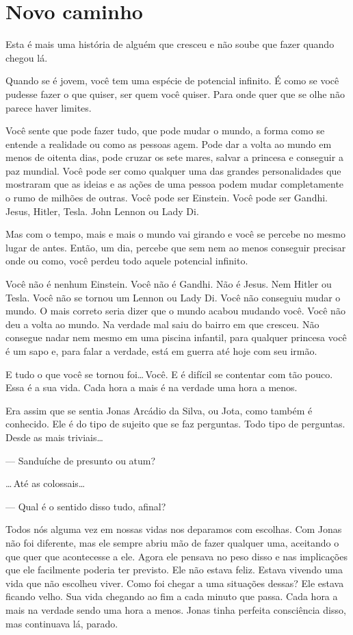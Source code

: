 \chapter{Novo caminho}

Esta é mais uma história de alguém que cresceu e não soube que fazer quando chegou lá.

Quando se é jovem, você tem uma espécie de potencial infinito. É como se você pudesse fazer o que quiser, ser quem você quiser. Para onde quer que se olhe não parece haver limites.

Você sente que pode fazer tudo, que pode mudar o mundo, a forma como se entende a realidade ou como as pessoas agem. Pode dar a volta ao mundo em menos de oitenta dias, pode cruzar os sete mares, salvar a princesa e conseguir a paz mundial. Você pode ser como qualquer uma das grandes personalidades que mostraram que as ideias e as ações de uma pessoa podem mudar completamente o rumo de milhões de outras. Você pode ser Einstein. Você pode ser Gandhi. Jesus, Hitler, Tesla. John Lennon ou Lady Di.

Mas com o tempo, mais e mais o mundo vai girando e você se percebe no mesmo lugar de antes. Então, um dia, percebe que sem nem ao menos conseguir precisar onde ou como, você perdeu todo aquele potencial infinito.

Você não é nenhum Einstein. Você não é Gandhi. Não é Jesus. Nem Hitler ou Tesla. Você não se tornou um Lennon ou Lady Di. Você não conseguiu mudar o mundo. O mais correto seria dizer que o mundo acabou mudando você. Você não deu a volta ao mundo. Na verdade mal saiu do bairro em que cresceu. Não consegue nadar nem mesmo em uma piscina infantil, para qualquer princesa você é um sapo e, para falar a verdade, está em guerra até hoje com seu irmão.

E tudo o que você se tornou foi\ldots\,Você. E é difícil se contentar com tão pouco. Essa é a sua vida. Cada hora a mais é na verdade uma hora a menos.

Era assim que se sentia Jonas Arcádio da Silva, ou Jota, como também é conhecido. Ele é do tipo de sujeito que se faz perguntas. Todo tipo de perguntas. Desde as mais triviais\ldots

--- Sanduíche de presunto ou atum?

\ldots\,Até as colossais\ldots

--- Qual é o sentido disso tudo, afinal?

Todos nós alguma vez em nossas vidas nos deparamos com escolhas. Com Jonas não foi diferente, mas ele sempre abriu mão de fazer qualquer uma, aceitando o que quer que acontecesse a ele. Agora ele pensava no peso disso e nas implicações que ele facilmente poderia ter previsto. Ele não estava feliz. Estava vivendo uma vida que não escolheu viver. Como foi chegar a uma situações dessas? Ele estava ficando velho. Sua vida chegando ao fim a cada minuto que passa. Cada hora a mais na verdade sendo uma hora a menos. Jonas tinha perfeita consciência disso, mas continuava lá, parado.

